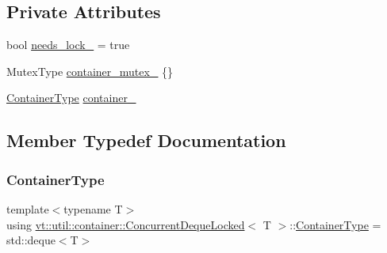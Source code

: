 \subsection*{Private Attributes}
\begin{DoxyCompactItemize}
\item 
bool \hyperlink{structvt_1_1util_1_1container_1_1_concurrent_deque_locked_af681c689f7800fca7e35364aeffd9964}{needs\+\_\+lock\+\_\+} = true
\item 
Mutex\+Type \hyperlink{structvt_1_1util_1_1container_1_1_concurrent_deque_locked_a04471e3de55c89728013825b6e64e453}{container\+\_\+mutex\+\_\+} \{\}
\item 
\hyperlink{structvt_1_1util_1_1container_1_1_concurrent_deque_locked_ab8d922cda54539b322830391268284bb}{Container\+Type} \hyperlink{structvt_1_1util_1_1container_1_1_concurrent_deque_locked_a5055eeb8cdb93e4e9fb84deb237998f2}{container\+\_\+}
\end{DoxyCompactItemize}


\subsection{Member Typedef Documentation}
\mbox{\label{structvt_1_1util_1_1container_1_1_concurrent_deque_locked_ab8d922cda54539b322830391268284bb}} 
\subsubsection{\texorpdfstring{Container\+Type}{ContainerType}}
{\footnotesize\ttfamily template$<$typename T$>$ \\
using \hyperlink{structvt_1_1util_1_1container_1_1_concurrent_deque_locked}{vt\+::util\+::container\+::\+Concurrent\+Deque\+Locked}$<$ T $>$\+::\hyperlink{structvt_1_1util_1_1container_1_1_concurrent_deque_locked_ab8d922cda54539b322830391268284bb}{Container\+Type} =  std\+::deque$<$T$>$}

\mbox{\label{structvt_1_1util_1_1container_1_1_concurrent_deque_locked_a6f35f4923f1329d25378656b0582e916}} 
